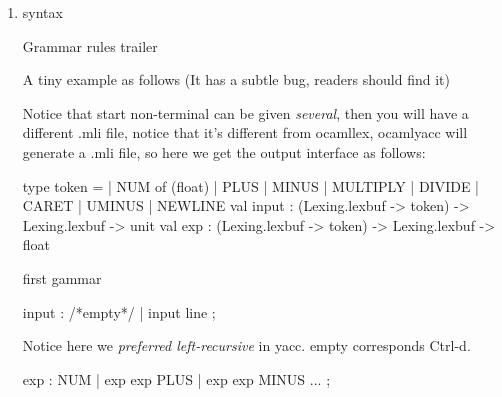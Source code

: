 \documentclass[12pt,a4paper]{article}
\begin{document}



\begin{enumerate}
\item syntax \\

  \begin{bluetext}
    Grammar rules 
    trailer 
  \end{bluetext}

A tiny example as follows (It has a subtle bug, readers should find it)  

Notice that start non-terminal can be given \textit{several}, then you will
have a different .mli file, notice that it's different from ocamllex,
ocamlyacc will generate a .mli file, so here we get the output
interface as follows:

\begin{bluecode}
type token =
  | NUM of (float)
  | PLUS
  | MINUS
  | MULTIPLY
  | DIVIDE
  | CARET
  | UMINUS
  | NEWLINE
val input :
  (Lexing.lexbuf  -> token) -> Lexing.lexbuf -> unit
val exp :
  (Lexing.lexbuf  -> token) -> Lexing.lexbuf -> float
\end{bluecode}


first gammar
\begin{bluetext}
  input : /*empty*/ {} | input line {}; 
\end{bluetext}
Notice here we \textit{preferred left-recursive} in yacc. empty corresponds
Ctrl-d.
\begin{bluetext}
  exp : NUM | exp exp PLUS | exp exp MINUS  ... ; 
\end{bluetext}


\end{enumerate}
\end{document}

